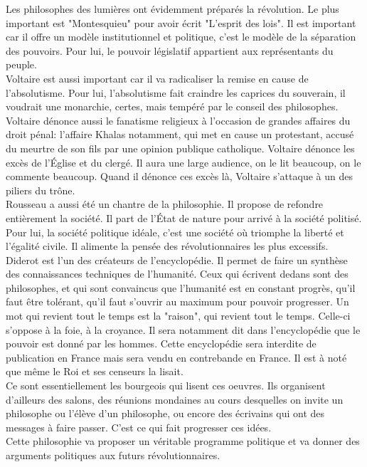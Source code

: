 \documentclass[10pt, a4paper, openany]{book}
\begin{document}
Les philosophes des lumières ont évidemment préparés la révolution. Le plus important est "Montesquieu" pour avoir écrit "L'esprit des lois". Il est important car il offre un modèle institutionnel et politique, c'est le modèle de la séparation des pouvoirs. Pour lui, le pouvoir législatif appartient aux représentants du peuple. \\
Voltaire est aussi important car il va radicaliser la remise en cause de l'absolutisme. Pour lui, l'absolutisme fait craindre les caprices du souverain, il voudrait une monarchie, certes, mais tempéré par le conseil des philosophes. Voltaire dénonce aussi le fanatisme religieux à l'occasion de grandes affaires du droit pénal: l'affaire Khalas notamment, qui met en cause un protestant, accusé du meurtre de son fils par une opinion publique catholique. Voltaire dénonce les excès de l'Église et du clergé. Il aura une large audience, on le lit beaucoup, on le commente beaucoup. Quand il dénonce ces excès là, Voltaire s'attaque à un des piliers du trône. \\
Rousseau a aussi été un chantre de la philosophie. Il propose de refondre entièrement la société. Il part de l'État de nature pour arrivé à la société politisé. Pour lui, la société politique idéale, c'est une société où triomphe la liberté et l'égalité civile. Il alimente la pensée des révolutionnaires les plus excessifs. \\
Diderot est l'un des créateurs de l'encyclopédie. Il permet de faire un synthèse des connaissances techniques de l'humanité. Ceux qui écrivent dedans sont des philosophes, et qui sont convaincus que l'humanité est en constant progrès, qu'il faut être tolérant, qu'il faut s'ouvrir au maximum pour pouvoir progresser. Un mot qui revient tout le temps est la "raison", qui revient tout le temps. Celle-ci s'oppose à la foie, à la croyance. Il sera notamment dit dans l'encyclopédie que le pouvoir est donné par les hommes. Cette encyclopédie sera interdite de publication en France mais sera vendu en contrebande en France. Il est à noté que même le Roi et ses censeurs la lisait. \\
Ce sont essentiellement les bourgeois qui lisent ces oeuvres. Ils organisent d'ailleurs des salons, des réunions mondaines au cours desquelles on invite un philosophe ou l'élève d'un philosophe, ou encore des écrivains qui ont des messages à faire passer. C'est ce qui fait progresser ces idées. \\
Cette philosophie va proposer un véritable programme politique et va donner des arguments politiques aux futurs révolutionnaires. 
\end{document}
